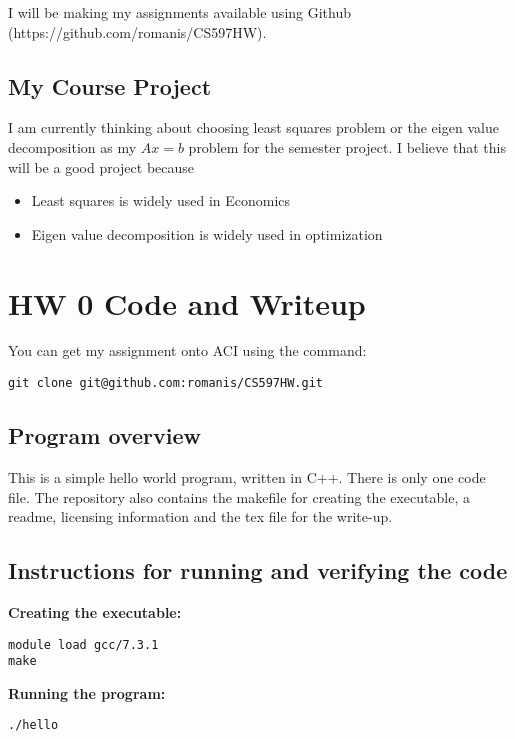 \documentclass{article}
\begin{document}
\begin{spacing}{1.1}
I will be making my assignments available using Github (https://github.com/romanis/CS597HW). 

\subsection{My Course Project}

I am currently thinking about choosing least squares problem or the eigen value decomposition as my $Ax=b$ problem for the semester project. I believe that this will be a good project because
\begin{itemize}
  \item Least squares is widely used in Economics
  \item Eigen value decomposition is widely used in optimization
\end{itemize}


\section{HW 0 Code and Writeup}

You can get my assignment onto ACI using the command:

\begin{verbatim}
git clone git@github.com:romanis/CS597HW.git
\end{verbatim}



\subsection{Program overview}

This is a simple hello world program, written in C++. There is only one code file. The repository also contains the makefile for creating the executable, a readme, licensing information and the tex file for the write-up.


\subsection{Instructions for running and verifying the code}

\textbf{Creating the executable:}
\begin{verbatim}
module load gcc/7.3.1
make
\end{verbatim}

\textbf{Running the program:}
\begin{verbatim}
./hello
\end{verbatim}


\end{spacing}
\end{document}
